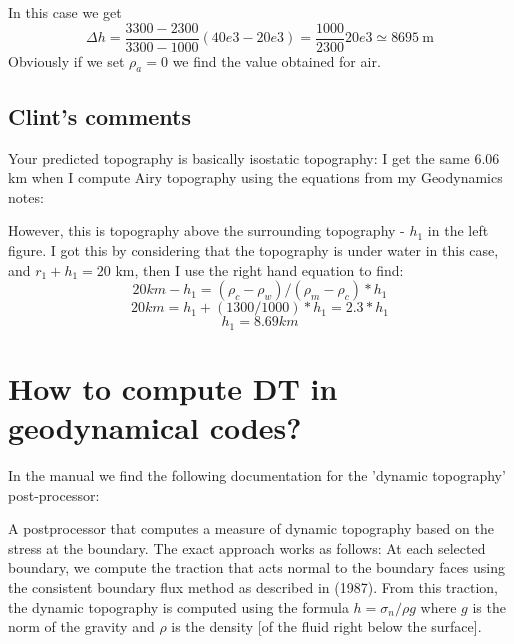 In this case we get 
\[
\Delta h =  \frac{ 3300- 2300}{3300-1000} (40e3 - 20e3) = \frac{1000}{2300} 20e3 \simeq 8695~\si{\meter} 
\]
Obviously if we set $\rho_a=0$ we find the value obtained for air.

\subsection*{Clint's comments}

{\color{darkgray} Your predicted topography is basically isostatic topography: 
I get the same 6.06 km when I compute Airy topography using the equations from my Geodynamics notes}:

\begin{center}
\end{center}

{\color{darkgray}
However, this is topography above the surrounding topography - $h_1$ in the left figure.
I got this by considering that the topography is under water in this case, and $r_1+h_1=20$ km, 
then I use the right hand equation to find:
\[
20 km - h_1 = (\rho_c - \rho_w)/(\rho_m - \rho_c) *h_1
\]
\[
20 km = h_1 + (1300/1000) * h_1 = 2.3*h_1
\]
\[
h_1 = 8.69 km
\]
}








\section*{How to compute DT in geodynamical codes?}

\noindent In the \aspect manual we find the following documentation for the 'dynamic topography' post-processor:
\begin{displayquote}
{\color{darkgray}
A postprocessor that computes a measure of dynamic topography based on the stress at the boundary. 
The exact approach works as follows: At each selected boundary, we compute the traction that acts normal to 
the boundary faces using the consistent boundary flux method as described in \textcite{grls87} (1987).
From this traction, the dynamic topography is computed using the formula $h=\sigma_n / \rho g$ where $g$
is the norm of the gravity and $\rho$
is the density [of the fluid right below the surface]. 
}
\end{displayquote}

